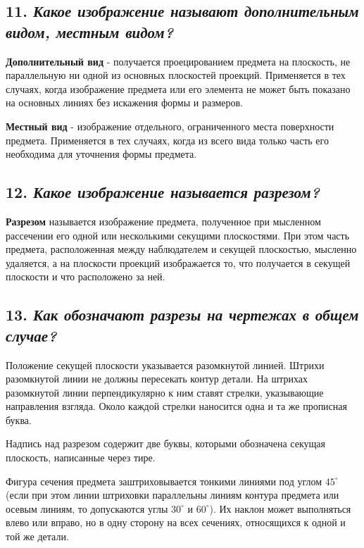 \subsection*{11. \textit{Какое изображение называют дополнительным видом, местным видом?}}

\textbf{Дополнительный вид} - получается проецированием предмета на плоскость, не параллельную ни одной из основных плоскостей проекций. Применяется в тех случаях, когда изображение предмета или его элемента не может быть показано на основных линиях без искажения формы и размеров.

\textbf{Местный вид} - изображение отдельного, ограниченного места поверхности предмета. Применяется в тех случаях, когда из всего вида только часть его необходима для уточнения формы предмета.
\subsection*{12. \textit{Какое изображение называется разрезом?}}

\textbf{Разрезом} называется изображение предмета, полученное при мысленном рассечении его одной или несколькими секущими плоскостями. При этом часть предмета, расположенная между наблюдателем и секущей плоскостью, мысленно удаляется, а на плоскости проекций изображается то, что получается в секущей плоскости и что расположено за ней.
\subsection*{13. \textit{Как обозначают разрезы на чертежах в общем случае?}}

Положение секущей плоскости указывается разомкнутой линией. Штрихи разомкнутой линии не должны пересекать контур детали. На штрихах разомкнутой линии перпендикулярно к ним ставят стрелки, указывающие направления взгляда. Около каждой стрелки наносится одна и та же прописная буква.




Надпись над разрезом содержит две буквы, которыми обозначена секущая плоскость, написанные через тире.

Фигура сечения предмета заштриховывается тонкими линиями под углом $45^{\circ}$ (если при этом линии штриховки параллельны линиям контура предмета или осевым линиям, то допускаются углы $30^{\circ}$ и $60^{\circ}$). Их наклон может выполняться влево или вправо, но в одну сторону на всех сечениях, относящихся к одной и той же детали.


